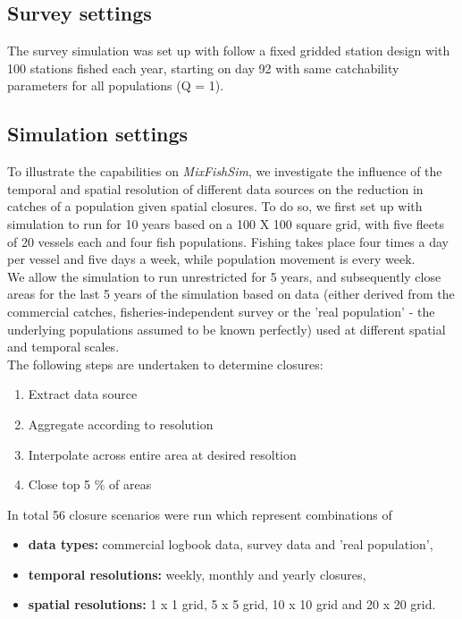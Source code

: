 \documentclass[review]{elsarticle}
\begin{document}
\subsection{Survey settings}

The survey simulation was set up with follow a fixed gridded station design
with 100 stations fished each year, starting on day 92 with same catchability
parameters for all populations (Q = 1). 

\subsection{Simulation settings}

To illustrate the capabilities on \emph{MixFishSim}, we investigate the
influence of the temporal and spatial resolution of different data sources on
the reduction in catches of a population given spatial closures. To do so, we
first set up with simulation to run for 10 years based on a 100 X 100 square
grid, with five fleets of 20 vessels each and four fish populations. Fishing
takes place four times a day per vessel and five days a week, while population
movement is every week. \\

We allow the simulation to run unrestricted for 5 years, and subsequently close
areas for the last 5 years of the simulation based on data (either derived from
the commercial catches, fisheries-independent survey or the 'real population' -
the underlying populations assumed to be known perfectly) used at different
spatial and temporal scales. \\

The following steps are undertaken to determine closures:

\begin{enumerate}
	\item Extract data source
	\item Aggregate according to resolution
	\item Interpolate across entire area at desired resoltion
	\item Close top 5 \% of areas
\end{enumerate}

In total 56 closure scenarios were run which represent combinations of

\begin{itemize}
	\item \textbf{data types:} commercial logbook data, survey data and
		'real population',
	\item \textbf{temporal resolutions:} weekly, monthly and yearly
		closures,
	\item \textbf{spatial resolutions:} 1 x 1 grid, 5 x 5 grid, 10 x 10
		grid and 20 x 20 grid.
\end{itemize}
\end{document}
